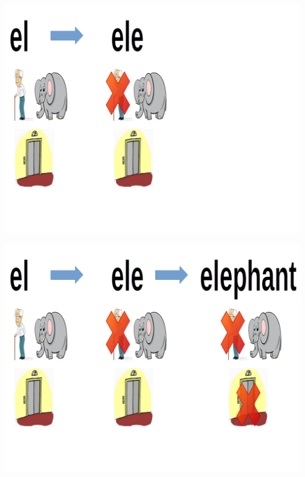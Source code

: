 \documentclass{beamer}
\begin{document}
\begin{frame}
\begin{center}
\includegraphics[scale=0.3]{img/ele_2.png}
\end{center}
\end{frame}

\begin{frame}
\begin{center}
\includegraphics[scale=0.3]{img/ele_3.png}
\end{center}
\end{frame}
\end{document}
